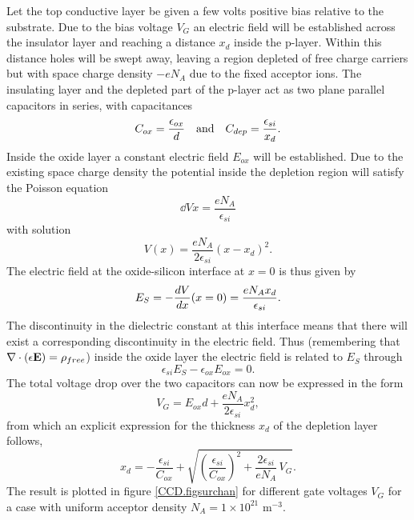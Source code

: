 Let the top conductive layer be given a few volts positive bias
relative to the substrate. Due to the bias voltage $V_G$ an electric
field will be established across the insulator layer and reaching a
distance $x_d$ inside the p-layer. Within this distance holes will be
swept away, leaving a region depleted of free charge carriers but with
space charge density $-e N_A$ due to the fixed acceptor ions. The
insulating layer and the depleted part of the p-layer act as two plane
parallel capacitors in series, with capacitances
\begin{equation}
  C_{ox} = \frac{\epsilon_{ox}}{d}
  \quad {\rm and} \quad C_{dep} = \frac{\epsilon_{si}}{x_d}.
\end{equation}
Inside the oxide layer a constant electric field $E_{ox}$ will be
established. Due to the existing space charge density the potential
inside the depletion region will satisfy the Poisson equation
\begin{equation}
  \dd{V}{x} = \frac{e N_A}{\epsilon_{si}}
\end{equation}
with solution
\begin{equation}
  V(x) = \frac{e N_A}{2\epsilon_{si}} (x-x_d)^2.
\end{equation}
The electric field at the oxide-silicon interface at $x=0$ is thus
given by
\begin{equation}
  E_S = -{dV\over dx}(x=0) = \frac{e N_A x_d}{\epsilon_{si}}.
\end{equation}
The discontinuity in the dielectric constant at this interface means
that there will exist a corresponding discontinuity in the electric
field. Thus (remembering that $\nabla\cdot(\epsilon{\bf E})=\rho_{free}$) 
inside the oxide layer the electric field is related to
$E_S$ through
\begin{equation}
  \epsilon_{si} E_S - \epsilon_{ox} E_{ox} = 0.
  \label{CCD.divD}
\end{equation}
The total voltage drop over the two capacitors can now be expressed in
the form
\begin{equation}
  V_G = E_{ox}d + \frac{e N_A}{2\epsilon_{si}} x_d^2,
  \label{CCD.surVG}
\end{equation}
from which an explicit expression for the thickness $x_d$ of the
depletion layer follows,
\begin{equation}
  x_d = -\frac{\epsilon_{si}}{C_{ox}} +
  \sqrt{\left(\frac{\epsilon_{si}}{C_{ox}}\right)^2
       +\frac{2\epsilon_{si}}{eN_A}\, V_G}.
  \label{CCD.xd}
\end{equation}
The result is plotted in figure \ref{CCD.figsurchan} for different
gate voltages $V_G$ for a case with uniform acceptor density $N_A =
1\times10^{21}$ m$^{-3}$.

